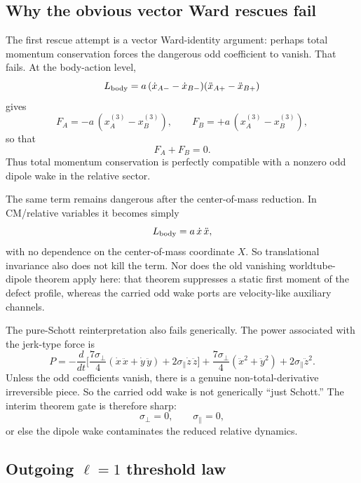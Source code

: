 \documentclass[11pt]{article}
\begin{document}
\subsection{Why the obvious vector Ward rescues fail}
\label{app:dipole-ledger-ward}

The first rescue attempt is a vector Ward-identity argument: perhaps total
momentum conservation forces the dangerous odd coefficient to vanish.  That
fails.  At the body-action level,
\[
L_{\rm body}=a\,(\dot x_{A-}-\dot x_{B-})(\ddot x_{A+}-\ddot x_{B+})
\]
gives
\[
F_A=-a\,(x_A^{(3)}-x_B^{(3)}),
\qquad
F_B=+a\,(x_A^{(3)}-x_B^{(3)}),
\]
so that
\[
F_A+F_B=0.
\]
Thus total momentum conservation is perfectly compatible with a nonzero odd
dipole wake in the relative sector.

The same term remains dangerous after the center-of-mass reduction.  In
CM/relative variables it becomes simply
\[
L_{\rm body}=a\,\dot x\,\ddot x,
\]
with no dependence on the center-of-mass coordinate $X$.  So translational
invariance also does not kill the term.  Nor does the old vanishing
worldtube-dipole theorem apply here: that theorem suppresses a static first
moment of the defect profile, whereas the carried odd wake ports are
velocity-like auxiliary channels.

The pure-Schott reinterpretation also fails generically.  The power associated
with the jerk-type force is
\[
P=
-\frac{d}{dt}\Bigg[
\frac{7\sigma_\perp}{4}(\dot x\,\ddot x+\dot y\,\ddot y)
+2\sigma_\parallel\dot z\,\ddot z
\Bigg]
+
\frac{7\sigma_\perp}{4}(\ddot x^2+\ddot y^2)
+2\sigma_\parallel\ddot z^2.
\]
Unless the odd coefficients vanish, there is a genuine non-total-derivative
irreversible piece.  So the carried odd wake is not generically ``just
Schott.''  The interim theorem gate is therefore sharp:
\[
\sigma_\perp=0,
\qquad
\sigma_\parallel=0,
\]
or else the dipole wake contaminates the reduced relative dynamics.

\subsection{Outgoing \texorpdfstring{$\ell=1$}{ell=1} threshold law}
\label{app:dipole-ledger-outgoing}
\end{document}
